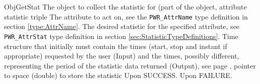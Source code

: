 \begin{prototype}{ObjGetStat}
			{\pInput}{The object to collect the statistic for (part of the object, attribute statistic triple}
			{\pInput}{The attribute to act on, see the \texttt{PWR_AttrName} type definition in section \ref{type:AttrName}.}
		{\pInput}{The desired statistic for the specified attribute, see \texttt{PWR_AttrStat} type definition in section \ref{sec:StatisticTypeDefinitions}.}
		{\pInputOutput}{Time structure that initially must contain the times (start, stop and instant if appropriate) requested by the user (Input) and the times, possibly      different, representing the period of the statistic data returned (Output), see page \pageref{type:TimePeriod}.}
			{\pOutput}{pointer to space (double) to store the statistic}
	 {Upon SUCCESS.}
	 {Upon FAILURE.}
\end{prototype}

